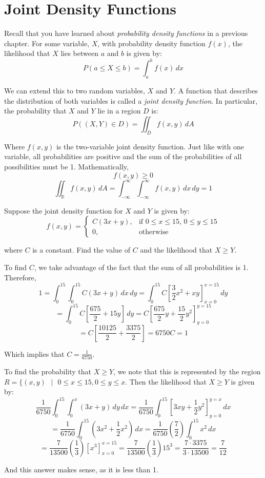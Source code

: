 \section{Joint Density Functions}
Recall that you have learned about \textit{probability density functions} in a 
previous chapter. For some variable, $X$, with probability density function 
$f(x)$, the likelihood that $X$ lies between $a$ and $b$ is given by:
$$P(a \leq X \leq b) = \int_a^b f(x)\,dx$$

We can extend this to two random variables, $X$ and $Y$. A function that 
describes the distribution of both variables is called a \textit{joint 
density function}. In particular, the probability
that $X$ and $Y$ lie in a region $D$ is:
$$P((X, Y) \in D) = \iint_{\textit{D}} f(x,y)\,dA$$

Where $f(x, y)$ is the two-variable joint density function. Just like with one 
variable, all probabilities are positive and the sum of the probabilities of 
all possibilities must be 1. Mathematically, 
$$f(x, y) \geq 0$$
$$\iint_{\mathbb{R}} f(x, y)\,dA = \int_{-\infty}^{\infty} \int_{-\infty}^{
\infty} f(x, y)\,dx\,dy = 1$$

\begin{Worked}
\begin{Problem}
Suppose the joint density function for $X$ and $Y$ is given 
by:
$$f(x, y) = 
\begin{cases}
C(3x + y),& \text{if }0 \leq x \leq 15\text{, }0 \leq y \leq 15\\
0,&\text{otherwise}
\end{cases}
$$

where $C$ is a constant. Find the value of $C$ and the likelihood that $X \geq 
Y$.
\end{Problem}
\begin{Solution}
To find $C$, we take advantage of the fact that the sum of 
all probabilities is 1. Therefore,
$$1 = \int_0^{15} \int_0^{15} C(3x + y)\,dx\,dy = \int_0^{15} C \left[ \frac{3
}{2}x^2 + xy \right]_{x = 0}^{x = 15}\,dy$$
$$= \int_0^{15} C \left[ \frac{675}{2} + 15y \right]\,dy = C \left[ \frac{675}{
2}y + \frac{15}{2}y^2 \right]_{y = 0}^{y = 15}$$
$$= C \left[ \frac{10125}{2} + \frac{3375}{2} \right] = 6750C = 1$$

Which implies that $C = \frac{1}{6750}$.

To find the probability that $X \geq Y$, we note that this is represented by 
the region $R = \{(x, y)\text{ }|\text{ }0 \leq x \leq 15, 0 \leq y \leq x$. 
Then the likelihood that $X \geq Y$ is given by:
$$\frac{1}{6750} \int_0^{15} \int_0^x \left( 3x + y \right) \,dy\,dx = \frac{
1}{6750} \int_0^{15} \left[ 3xy + \frac{1}{2}y^2 \right]_{y = 0}^{y = x}\,dx$$
$$= \frac{1}{6750} \int_0^{15} \left(3x^2 + \frac{1}{2}x^2 \right)\,dx = \frac{
1}{6750} \left( \frac{7}{2} \right) \int_0^{15} x^2\,dx$$
$$= \frac{7}{13500} \left( \frac{1}{3} \right) \left[x^3 \right]_{x = 0}^{x = 
15} = \frac{7}{13500} \left( \frac{1}{3} \right) 15^3 = \frac{7 \cdot 3375}{3 
\cdot 13500} = \frac{7}{12}$$

And this answer makes sense, as it is less than 1. 
\end{Solution}
\end{Worked}


